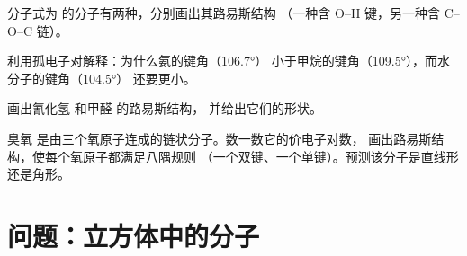 \begin{exercise}[$\star\star\star$]\label{exo:g10:lewis-and-shape:12}
分子式为  的分子有两种，分别画出其路易斯结构
（一种含 O--H 键，另一种含 C--O--C 链）。
\end{exercise}

\begin{exercise}[$\star\star\star$]\label{exo:g10:lewis-and-shape:13}
利用孤电子对解释：为什么氨的键角（\ang{106.7}）
小于甲烷的键角（\ang{109.5}），而水分子的键角（\ang{104.5}）
还要更小。
\end{exercise}

\begin{exercise}[$\star\star\star$]\label{exo:g10:lewis-and-shape:14}
画出氰化氢  和甲醛  的路易斯结构，
并给出它们的形状。
\end{exercise}

\begin{exercise}[$\star\star\star$]\label{exo:g10:lewis-and-shape:15}
臭氧  是由三个氧原子连成的链状分子。数一数它的价电子对数，
画出路易斯结构，使每个氧原子都满足八隅规则
（一个双键、一个单键）。预测该分子是直线形
还是角形。
\end{exercise}

\section{问题：立方体中的分子}

